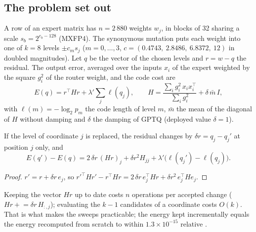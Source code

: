 \subsection{The problem set out}\label{t3mim:sec:p5-probleme}

A row of an expert matrix has $n = 2\,880$ weights $w_j$, in blocks of 32 sharing a scale $s_b = 2^{e_b - 128}$ (MXFP4). The synonymous mutation puts each weight into one of $k = 8$ levels $\pm c_m s_j$ ($m = 0, \dots, 3$, $c = (0.4743,\ 2.8486,\ 6.8372,\ 12)$ in doubled magnitudes). Let $q$ be the vector of the chosen levels and $r = w - q$ the residual. The output error, averaged over the inputs $x_i$ of the expert weighted by the square $g_i^2$ of the router weight, and the code cost are
\begin{equation}\label{t3mim:eq:p5-energie}
E(q) = r^\top H r + \lambda' \sum_j \ell(q_j), \qquad H = \frac{\sum_i g_i^2\,x_i x_i^\top}{\sum_i g_i^2} + \delta\,\bar m\,I,
\end{equation}
with $\ell(m) = -\log_2 p_m$ the code length of level $m$, $\bar m$ the mean of the diagonal of $H$ without damping and $\delta$ the damping of GPTQ (deployed value $\delta = 1$).

\begin{lemme}\label{t3mim:lem:variation}
If the level of coordinate $j$ is replaced, the residual changes by $\delta r = q_j - q_j'$ at position $j$ only, and
\[
E(q') - E(q) = 2\,\delta r\,(Hr)_j + \delta r^2 H_{jj} + \lambda'\bigl(\ell(q_j') - \ell(q_j)\bigr).
\]
\end{lemme}
\begin{proof}
$r' = r + \delta r\,e_j$, so $r'^\top H r' - r^\top H r = 2\,\delta r\,e_j^\top H r + \delta r^2\,e_j^\top H e_j$.
\end{proof}
Keeping the vector $Hr$ up to date costs $n$ operations per accepted change ($Hr \mathrel{+}= \delta r\,H_{:,j}$); evaluating the $k - 1$ candidates of a coordinate costs $O(k)$. That is what makes the sweeps practicable; the energy kept incrementally equals the energy recomputed from scratch to within $1.3 \times 10^{-15}$ relative \mes.

